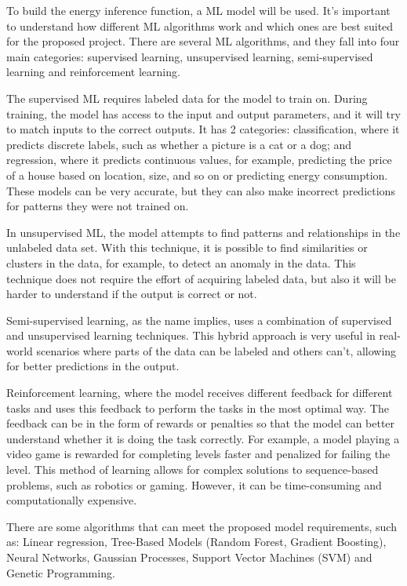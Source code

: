 \documentclass[sigplan]{acmart}
\begin{document}
To build the energy inference function, a ML model will be used. It's important to understand how different ML algorithms work and which ones are best suited for the proposed project. There are several ML algorithms, and they fall into four main categories\cite{sarker2021machine}: supervised learning, unsupervised learning, semi-supervised learning and reinforcement learning.

The supervised ML requires labeled data for the model to train on. During training, the model has access to the input and output parameters, and it will try to match inputs to the correct outputs. It has 2 categories: classification, where it predicts discrete labels, such as whether a picture is a cat or a dog; and regression, where it predicts continuous values, for example, predicting the price of a house based on location, size, and so on or predicting energy consumption. These models can be very accurate, but they can also make incorrect predictions for patterns they were not trained on.

In unsupervised ML, the model attempts to find patterns and relationships in the unlabeled data set. With this technique, it is possible to find similarities or clusters in the data, for example, to detect an anomaly in the data. This technique does not require the effort of acquiring labeled data, but also it will be harder to understand if the output is correct or not.

Semi-supervised learning, as the name implies, uses a combination of supervised and unsupervised learning techniques. This hybrid approach is very useful in real-world scenarios where parts of the data can be labeled and others can't, allowing for better predictions in the output.

Reinforcement learning, where the model receives different feedback for different tasks and uses this feedback to perform the tasks in the most optimal way. The feedback can be in the form of rewards or penalties so that the model can better understand whether it is doing the task correctly. For example, a model playing a video game is rewarded for completing levels faster and penalized for failing the level. This method of learning allows for complex solutions to sequence-based problems, such as robotics or gaming. However, it can be time-consuming and computationally expensive.

There are some algorithms that can meet the proposed model requirements, such as: Linear regression, Tree-Based Models (Random Forest, Gradient Boosting), Neural Networks, Gaussian Processes, Support Vector Machines (SVM) and Genetic Programming.
\end{document}
